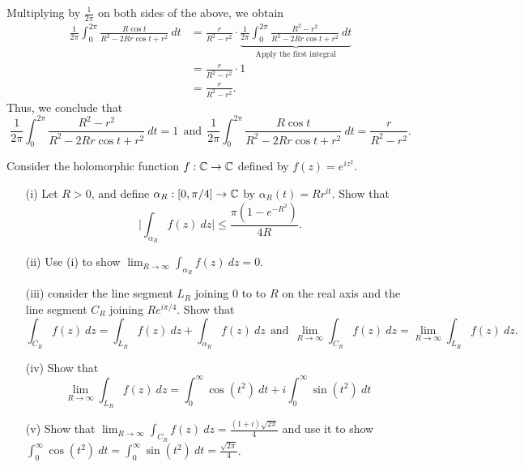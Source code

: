 \documentclass[a4paper]{article}
\begin{document}
\begin{solution}[b]
    Multiplying by \( \frac{ 1 }{ 2\pi  }  \) on both sides of the above, we obtain
    \begin{align*}
        \frac{ 1 }{ 2 \pi  }  \int_{ 0 }^{ 2 \pi  } \frac{ R \cos t  }{ R^{2} - 2 R r \cos t + r^{2} }  \ dt &= \frac{ r  }{ R^{2} - r^{2} } \cdot \underbrace{   \frac{ 1 }{ 2 \pi  }  \int_{ 0 }^{ 2 \pi  }  \frac{ R^{2} - r^{2} }{ R^{2} - 2 R r \cos t + r^{2} }  \ dt}_{\text{Apply the first integral}} \\
                                                                                                             &= \frac{ r  }{ R^{2} -r^{2}  } \cdot 1  \\
                                                                                                             &= \frac{ r  }{ R^{2} -r^{2} }.  
\end{align*}
Thus, we conclude that 
                \[  \frac{ 1 }{ 2 \pi }  \int_{ 0 }^{ 2 \pi }  \frac{ R^{2} - r^{2}  }{  R^{2} - 2 Rr \cos t + r^{2} }  \ dt = 1 \ \ \text{and} \ \ \frac{ 1 }{ 2 \pi }  \int_{ 0 }^{ 2 \pi }  \frac{ R \cos t  }{  R^{2} - 2R r \cos t + r^{2} }  \ dt = \frac{ r  }{ R^{2} - r^{2} }. \]
    
\end{solution}



\begin{problem}
   Consider the holomorphic function \( f: \mathbb{C} \to \mathbb{C}  \) defined by \( f(z) = e^{i z^{2}} \). 
   \begin{enumerate}
       \item[(i)] Let \( R > 0  \), and define \( {\alpha}_{R}: [0, \pi /4] \to \mathbb{C}  \) by \( {\alpha}_{R }(t) = R r^{i t} \). Show that 
           \[  \Big| \int_{ {\alpha}_{R} }^{  } f(z) \ dz   \Big|  \leq \frac{ \pi (1 - e^{- R^{2}}) }{ 4 R }. \]
       \item[(ii)] Use (i) to show \( \lim_{ R \to \infty  } \displaystyle \int_{{\alpha}_{R}}^{} f(z)  \ d z = 0  \).
        \item[(iii)] consider the line segment \( {L}_{R} \) joining \( 0  \) to to \( R  \) on the real axis and the line segment \( {C}_{R} \) joining \( R e^{i\pi /4} \). Show that 
            \[  \int_{ {C}_{R} }^{  } f(z) \ dz = \int_{ {L}_{R} }^{  } f(z) \ dz + \int_{ {\alpha}_{R} }^{  } f(z) \ dz \ \ \text{and} \ \ \lim_{ R  \to \infty  }  \int_{ {C}_{R} }^{  } f(z) \ dz = \lim_{ R \to \infty  } \int_{ {L}_{R} }^{  } f(z) \ dz.  \]
        \item[(iv)] Show that 
            \[  \lim_{ R \to \infty  }  \int_{ {L}_{R} }^{  } f(z) \ dz = \int_{ 0 }^{ \infty  }  \cos (t^{2})  \ dt + i \int_{ 0  }^{ \infty  }  \sin (t^{2}) \ dt \ \  \]
        \item[(v)] Show that \( \lim_{ R \to \infty  }  \displaystyle \int_{{C}_{R}}^{}  f(z) \ d z = \frac{ (1+i) \sqrt{ 2\pi }  }{ 4 }  \) and use it to show \( \displaystyle \int_{0}^{\infty } \cos (t^{2})  \ d t = \displaystyle \int_{0}^{\infty }  \sin (t^{2}) \ d t = \frac{ \sqrt{ 2\pi }  }{ 4 }  \).
   \end{enumerate}
\end{problem}
\end{document}
